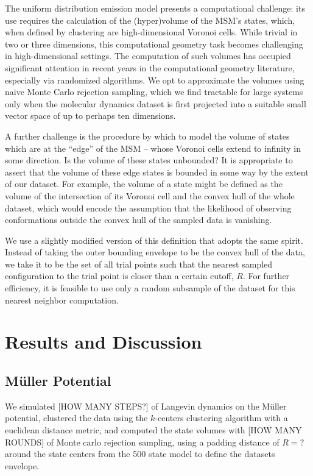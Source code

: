 \documentclass[twocolumn,floatfix,nofootinbib,aps]{revtex4-1}
\begin{document}
The uniform distribution emission model presents a computational challenge: its use requires the calculation of the (hyper)volume of the MSM's states, which, when defined by clustering are high-dimensional Voronoi cells. While trivial in two or three dimensions, this computational geometry task becomes challenging in high-dimensional settings. The computation of such volumes has occupied significant attention in recent years in the computational geometry literature, especially via randomized algorithms\cite{Kannan97, Simonovits03, Lovasz03}. We opt to approximate the volumes using naive Monte Carlo rejection sampling, which we find tractable for large systems only when the molecular dynamics dataset is first projected into a suitable small vector space of up to perhaps ten dimensions.

A further challenge is the procedure by which to model the volume of states which are at the ``edge'' of the MSM -- whose Voronoi cells extend to infinity in some direction. Is the volume of these states unbounded? It is appropriate to assert that the volume of these edge states is bounded in some way by the extent of our dataset. For example, the volume of a state might be defined as the volume of the intersection of its Voronoi cell and the convex hull of the whole dataset, which would encode the assumption that the likelihood of observing conformations outside the convex hull of the sampled data is vanishing.

We use a slightly modified version of this definition that adopts the same spirit. Instead of taking the outer bounding envelope to be the convex hull of the data, we take it to be the set of all trial points such that the nearest sampled configuration to the trial point is closer than a certain cutoff, $R$. For further efficiency, it is feasible to use only a random subsample of the dataset for this nearest neighbor computation.

\section{Results and Discussion}
\subsection{M\"{u}ller Potential}
We simulated [HOW MANY STEPS?] of Langevin dynamics on the M\"{u}ller potential, clustered the data using the $k$-centers clustering algorithm with a euclidean distance metric, and computed the state volumes with [HOW MANY ROUNDS] of Monte carlo rejection sampling, using a padding distance of $R=?$ around the state centers from the 500 state model to define the datasets envelope.
\end{document}
